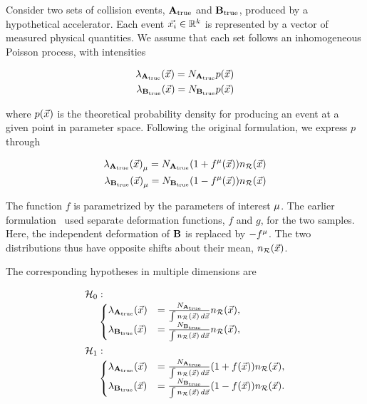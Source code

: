 \documentclass[paper/ddppaper2.tex]{subfiles}
\begin{document}
Consider two sets of collision events, ${{\mathbf{A}}}_{\text{true}}$ and ${{\mathbf{B}}}_{\text{true}}$, produced by a hypothetical accelerator. Each event ${\vec{{x}_i}} \in \mathbb{R}^k$ is represented by a vector of measured physical quantities. We assume that each set follows an inhomogeneous Poisson process, with intensities

\begin{equation}   
\begin{aligned}
    {{\lambda}_{{{\mathbf{A}}}_{\text{true}}}(\vec{{x}})}={N_{{{\mathbf{A}}}_{\text{true}}}} p(\vec{{x}})\\
    {{\lambda}_{{{\mathbf{B}}}_{\text{true}}}(\vec{{x}})}={N_{{{\mathbf{B}}}_{\text{true}}}} p(\vec{{x}})
\end{aligned}
\end{equation}

\noindent where $p(\vec{{x}})$ is the theoretical probability density for producing an event at a given point in parameter space. Following the original formulation, we express $p$ through

\begin{eqnarray}
\label{eq:process_probability_distribution}
\begin{aligned}
    \dist{\true{A}}_\param = N_{\true{A}} (1+{\paramf(\anyevent)}) \refdist \\
    \dist{\true{B}}_\param = N_{\true{B}} (1-{\paramf(\anyevent)}) \refdist
\end{aligned}
\end{eqnarray}

\noindent The function $f$ is parametrized by the parameters of interest ${\mu}$. The earlier formulation~\cite{LastDDPPaper} used separate deformation functions, $f$ and $g$, for the two samples. Here, the independent deformation of ${\mathbf{B}}$ is replaced by $-{f^{{\mu}}}$. The two distributions thus have opposite shifts about their mean, $n_{\mathcal{R}}({\vec{{x}}})$.

The corresponding hypotheses in multiple dimensions are

\begin{equation}
\label{eq:learnable_distribution}
\begin{aligned}
    \nullhypothesis &:\\[-0.5ex]
    &\begin{cases}
        \dist{\true{A}}
        &=
        \frac{N_{\true{A}}}
            {\int \refdist\,d\anyevent}
        \refdist,
        \\
        \dist{\true{B}}
        &=
        \frac{N_{\true{B}}}
            {\int \refdist\,d\anyevent}
        \refdist,
    \end{cases} \\
    \hypothesis{1} &:\\[-0.5ex]
    &\begin{cases}
        \dist{\true{A}}
        &=
        \frac{N_{\true{A}}}
            {\int \refdist\,d\anyevent}
        (1 + f(\anyevent)) \refdist,
        \\
        \dist{\true{B}}
        &=
        \frac{N_{\true{B}}}
            {\int \refdist\,d\anyevent}
        (1 - f(\anyevent)) \refdist.
    \end{cases}
\end{aligned}
\end{equation}
\end{document}
